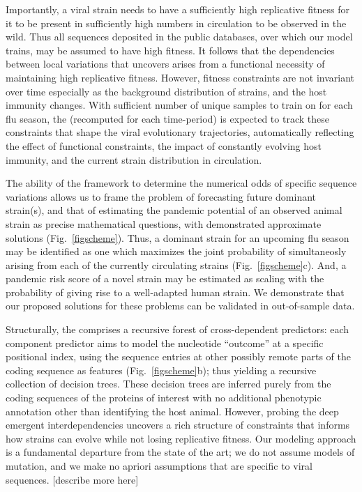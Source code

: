 \documentclass[onecolumn, compsoc,10pt]{IEEEtran}
\begin{document}
Importantly,  a viral strain needs to have a  sufficiently high replicative fitness for it to be present in sufficiently high numbers in circulation to be  observed in the wild. Thus all sequences deposited in the public  databases, over which our model trains, may be assumed to have high fitness. It follows that the  dependencies between local variations that \enet uncovers arises from a  functional necessity of maintaining high replicative fitness. However,  fitness constraints are not invariant over time especially as the background distribution of strains, and the host immunity changes. With sufficient number of unique samples to train on for each flu season, the \enet (recomputed for each time-period) is expected to  track these constraints that shape the viral evolutionary trajectories, automatically reflecting the effect of  functional constraints, the impact of constantly evolving host immunity, and the current strain distribution in circulation.  

The ability of the \enet framework to determine the numerical odds of specific sequence variations allows us to frame the problem of forecasting future dominant strain(s), and that of estimating the  pandemic potential of an observed animal strain as precise mathematical questions, with demonstrated approximate solutions (Fig.~\ref{figscheme}). Thus,  a dominant strain for an upcoming flu season
may be identified as one which maximizes the joint probability of simultaneosly arising from each of the currently circulating strains (Fig.~\ref{figscheme}c).
And, a pandemic risk score of a novel strain may be estimated as scaling with the probability of giving rise to a well-adapted human strain. We demonstrate that our proposed solutions for these problems can be validated in out-of-sample data.

Structurally, the \enet comprises a recursive forest of  cross-dependent predictors: each component predictor aims to model the nucleotide ``outcome'' at a specific positional index, using the sequence entries at other possibly remote parts of the coding sequence as features (Fig.~\ref{figscheme}b); thus yielding a recursive collection of decision trees. These decision trees are %
inferred purely from the  coding  sequences of the proteins of interest with no additional phenotypic annotation other than identifying the host animal. However, probing the deep emergent interdependencies uncovers a rich structure of constraints that informs how strains can evolve while not  losing replicative fitness. Our modeling approach is a fundamental departure from the state of the art; we do not assume models of mutation, and we make no apriori assumptions that are specific to \infl viral sequences. [describe more here]
\end{document}
